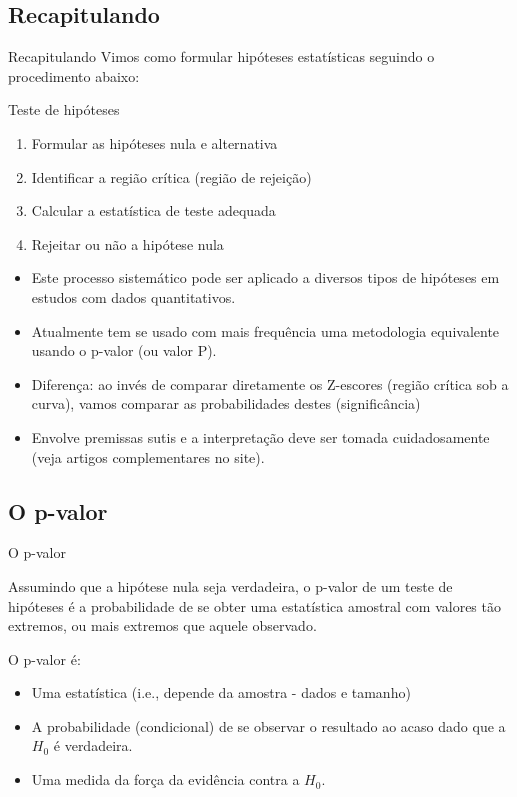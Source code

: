 \documentclass{beamer}
\begin{document}
\subsection{Recapitulando}

\begin{frame}{Recapitulando}
  Vimos como formular hipóteses estatísticas seguindo o procedimento
  abaixo:
  \begin{block}{Teste de hipóteses}
    \begin{enumerate}
    \item Formular as hipóteses nula e alternativa
    \item Identificar a região crítica (região de rejeição)
    \item Calcular a estatística de teste adequada
    \item Rejeitar ou não a hipótese nula
    \end{enumerate}
  \end{block}
\end{frame}

\begin{frame}{}
  \begin{itemize}
  \item Este processo sistemático pode ser aplicado a diversos tipos
    de hipóteses em estudos com dados quantitativos.
  \item Atualmente tem se usado com mais frequência uma metodologia
    equivalente usando o p-valor (ou valor P).
  \item Diferença: ao invés de comparar diretamente os Z-escores
    (região crítica sob a curva), vamos comparar as probabilidades
    destes (significância)
  \item Envolve premissas sutis e a interpretação deve ser tomada
    cuidadosamente (veja artigos complementares no site).
  \end{itemize}
\end{frame}


\subsection{O p-valor}

\begin{frame}{O p-valor}
  \begin{definition}
    Assumindo que a hipótese nula seja verdadeira, o \alert{p-valor}
    de um teste de hipóteses é a probabilidade de se obter uma
    estatística amostral com valores tão extremos, ou mais extremos
    que aquele observado.
  \end{definition}

O p-valor \alert{é}:
  \begin{itemize}
  \item Uma estatística (i.e., depende da amostra - dados e tamanho)
  \item A probabilidade (condicional) de se observar o resultado ao
    acaso \alert{dado que} a $H_0$ é verdadeira.
  \item Uma medida da força da evidência contra a $H_0$.
  \end{itemize}
\end{frame}
\end{document}
